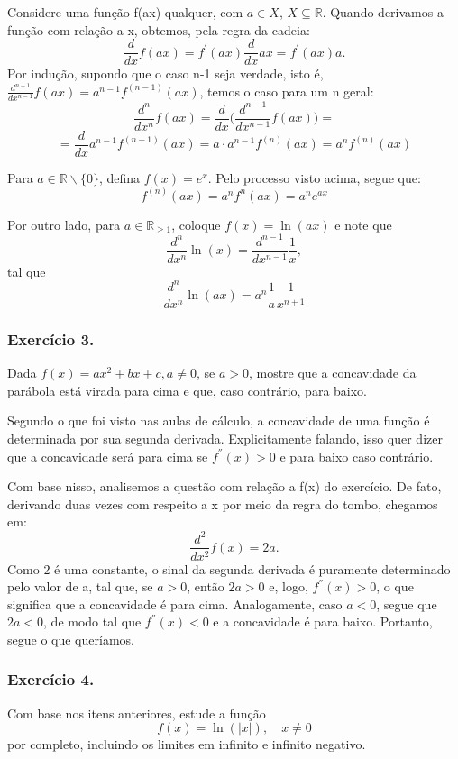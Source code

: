 \documentclass[Calculus1/exercícios_de_cálculo.tex]{subfiles}
\begin{document}
\begin{proof*}
	Considere uma função f(ax) qualquer, com $a\in{X}$, $X\subseteq{\mathbb{R}}$.
	Quando derivamos a função com relação a x, obtemos, pela regra da
	cadeia:
	\[
		\frac{d}{dx}f(ax) = f^{'}(ax)\frac{d}{dx}ax = f^{'}(ax)a.
	\]
	Por indução, supondo que o caso n-1 seja verdade, isto é,
	$\frac{d^{n-1}}{d x^{n-1}}f(ax) = a^{n-1}f^{(n-1)}(ax)$, temos o caso para um n
	geral:
	\[
		\frac{d^{n}}{d x^{n}}f(ax) = \frac{d}{dx}\biggl(\frac{d^{n-1}}{d x^{n-1}}f(ax)\biggr) =
	\]
	\[
		= \frac{d}{dx}a^{n-1}f^{(n-1)}(ax) = a\cdot{a^{n-1}}f^{(n)}(ax) = a^{n}f^{(n)}(ax)
	\]

	Para $a\in{\mathbb{R}\backslash\{0\}}$, defina $f(x) = e^{x}$. Pelo processo visto
	acima, segue que:
	\[
		f^{(n)}(ax) = a^{n}f^{n}(ax) = a^{n}e^{ax}
	\]

	Por outro lado, para $a\in{\mathbb{R}_{\geq1}}$, coloque $f(x) = \ln(ax)$ e
	note que
	\[
		\frac{d^{n}}{dx^{n}}\ln(x) = \frac{d^{n-1}}{dx^{n-1}}\frac{1}{x},
	\]
	tal que
	\[
		\frac{d^{n}}{dx^{n}}\ln(ax) = a^{n}\frac{1}{a}\frac{1}{x^{n+1}}
	\]
\end{proof*}

\subsubsection{Exercício 3.}
Dada $f(x) = ax^{2}+ bx + c, a\neq{0}$, se $a > 0$, mostre que a concavidade da
parábola está virada para cima e que, caso contrário, para baixo.

\begin{proof*}
	Segundo o que foi visto nas aulas de cálculo, a concavidade de uma função
	é determinada por sua segunda derivada. Explicitamente falando, isso quer
	dizer que a concavidade será para cima se $f^{''}(x) > 0$ e para baixo caso
	contrário.

	Com base nisso, analisemos a questão com relação a f(x) do exercício.
	De fato, derivando duas vezes com respeito a x por meio da regra do tombo,
	chegamos em:
	\[
		\frac{d^{2}}{dx^{2}}f(x) = 2a.
	\]
	Como 2 é uma constante, o sinal da segunda derivada é puramente
	determinado pelo valor de a, tal que, se $a > 0$, então $2a > 0$ e, logo, $f^{''}
		(x) > 0$, o que significa que a concavidade é para cima. Analogamente, caso $a
		< 0$, segue que $2a < 0$, de modo tal que $f^{''}(x) < 0$ e a concavidade é
	para baixo. Portanto, segue o que queríamos. \qedsymbol
\end{proof*}

\subsubsection{Exercício 4.}
Com base nos itens anteriores, estude a função
\[
	f(x) = \ln(|x|), \quad x\neq{0}
\]
por completo, incluindo os limites em infinito e infinito negativo.
\end{document}
